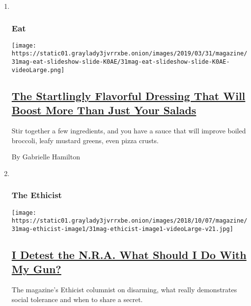 \begin{enumerate}
\def\labelenumi{\arabic{enumi}.}
\item ~
  \hypertarget{eat}{%
  \subsubsection{Eat}\label{eat}}

  \texttt{[image: https://static01.graylady3jvrrxbe.onion/images/2019/03/31/magazine/31mag-eat-slideshow-slide-K0AE/31mag-eat-slideshow-slide-K0AE-videoLarge.png]}

  \hypertarget{the-startlingly-flavorful-dressing-that-will-boost-more-than-just-your-salads}{%
  \subsection{\texorpdfstring{\href{/2019/03/27/magazine/anchovy-dressing-salad-recipe.html}{The
  Startlingly Flavorful Dressing That Will Boost More Than Just Your
  Salads}}{The Startlingly Flavorful Dressing That Will Boost More Than Just Your Salads}}\label{the-startlingly-flavorful-dressing-that-will-boost-more-than-just-your-salads}}

  Stir together a few ingredients, and you have a sauce that will
  improve boiled broccoli, leafy mustard greens, even pizza crusts.

  By Gabrielle Hamilton
\item ~
  \hypertarget{the-ethicist}{%
  \subsubsection{The Ethicist}\label{the-ethicist}}

  \texttt{[image: https://static01.graylady3jvrrxbe.onion/images/2018/10/07/magazine/31mag-ethicist-image1/31mag-ethicist-image1-videoLarge-v21.jpg]}

  \hypertarget{i-detest-the-nra-what-should-i-do-with-my-gun}{%
  \subsection{\texorpdfstring{\href{/2019/03/26/magazine/i-detest-the-nra-what-should-i-do-with-my-gun.html}{I
  Detest the N.R.A. What Should I Do With My
  Gun?}}{I Detest the N.R.A. What Should I Do With My Gun?}}\label{i-detest-the-nra-what-should-i-do-with-my-gun}}

  The magazine's Ethicist columnist on disarming, what really
  demonstrates social tolerance and when to share a secret.


\end{enumerate}
